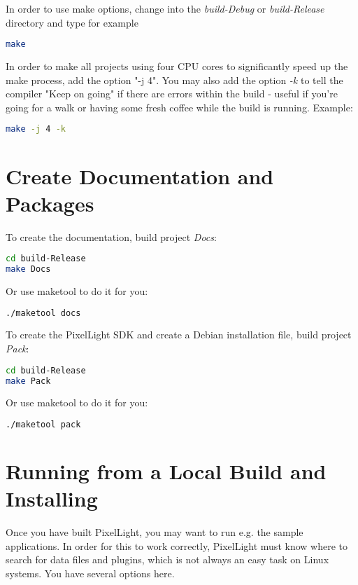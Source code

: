 In order to use make options, change into the \emph{build-Debug} or \emph{build-Release} directory and type for example
\begin{lstlisting}[language=bash]
make
\end{lstlisting}
In order to make all projects using four CPU cores to significantly speed up the make process, add the option "-j 4". You may also add the option \emph{-k} to tell the compiler "Keep on going" if there are errors within the build - useful if you're going for a walk or having some fresh coffee while the build is running. Example:
\begin{lstlisting}[language=bash]
make -j 4 -k
\end{lstlisting}




\section{Create Documentation and Packages}
To create the documentation, build project \emph{Docs}:
\begin{lstlisting}[language=bash]
cd build-Release
make Docs
\end{lstlisting}

Or use maketool to do it for you:
\begin{lstlisting}[language=bash]
./maketool docs
\end{lstlisting}

To create the PixelLight SDK and create a Debian installation file, build project \emph{Pack}:
\begin{lstlisting}[language=bash]
cd build-Release
make Pack
\end{lstlisting}

Or use maketool to do it for you:
\begin{lstlisting}[language=bash]
./maketool pack
\end{lstlisting}




\section{Running from a Local Build and Installing}
Once you have built PixelLight, you may want to run e.g. the sample applications. In order for this to work correctly, PixelLight must know where to search for data files and plugins, which is not always an easy task on Linux systems. You have several options here.



